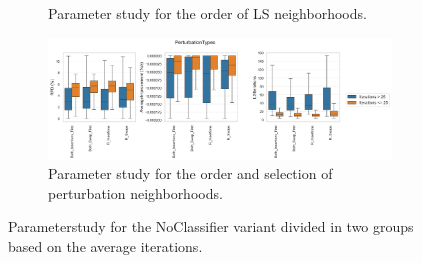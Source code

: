 \begin{figure}[!ht]
\begin{subfigure}[t]{0.83\textwidth}
		\caption{Parameter study for the order of LS neighborhoods.}
	\end{subfigure}
	\begin{subfigure}[t]{0.83\textwidth}
		\centering
		\includegraphics[width=\textwidth]{pictures/parameter_study/PerturbationTypes_base_parameter_study.png}
		\caption{Parameter study for the order and selection of perturbation neighborhoods.}
	\end{subfigure}
	\caption{Parameterstudy for the NoClassifier variant divided in two groups based on the average iterations.}
\end{figure}

\FloatBarrier
